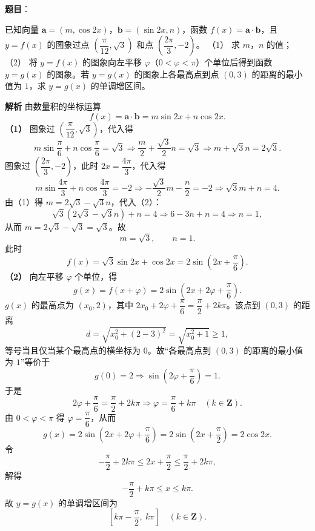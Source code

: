 \begin{answer}

\textbf{题目}：

已知向量 $\boldsymbol a=(m,\cos2x)$，$\boldsymbol b=(\sin2x,n)$，函数 $f(x)=\boldsymbol a\cdot\boldsymbol b$，且 $y=f(x)$ 的图象过点 $\left(\dfrac\pi{12},\sqrt3\right)$ 和点 $\left(\dfrac{2\pi}3,-2\right)$。
（1） 求 $m$，$n$ 的值；
（2） 将 $y=f(x)$ 的图象向左平移 $\varphi$（$0<\varphi<\pi$）个单位后得到函数 $y=g(x)$ 的图象。若 $y=g(x)$ 的图象上各最高点到点 $(0,3)$ 的距离的最小值为 $1$，求 $y=g(x)$ 的单调增区间。

\textbf{解析}
由数量积的坐标运算
\nopagebreak[4]
\[f(x)=\boldsymbol a\cdot\boldsymbol b=m\sin2x+n\cos2x .\]
\textbf{（1）} 图象过 $\left(\dfrac\pi{12},\sqrt3\right)$，代入得
\nopagebreak[4]
\[m\sin\frac\pi6+n\cos\frac\pi6=\sqrt3
\Longrightarrow\frac m2+\frac{\sqrt3}2n=\sqrt3
\Longrightarrow m+\sqrt3n=2\sqrt3 .\tag{1}\]
图象过 $\left(\dfrac{2\pi}3,-2\right)$，此时 $2x=\dfrac{4\pi}3$，代入得
\nopagebreak[4]
\[m\sin\frac{4\pi}3+n\cos\frac{4\pi}3=-2
\Longrightarrow-\frac{\sqrt3}2m-\frac n2=-2
\Longrightarrow\sqrt3m+n=4 .\tag{2}\]
由（1）得 $m=2\sqrt3-\sqrt3n$，代入（2）：
\nopagebreak[4]
\[\sqrt3(2\sqrt3-\sqrt3n)+n=4\Longrightarrow6-3n+n=4\Longrightarrow n=1,\]
从而 $m=2\sqrt3-\sqrt3=\sqrt3$。故
\nopagebreak[4]
\[m=\sqrt3,\qquad n=1 .\]
此时
\nopagebreak[4]
\[f(x)=\sqrt3\sin2x+\cos2x=2\sin\left(2x+\frac\pi6\right).\]
\textbf{（2）} 向左平移 $\varphi$ 个单位，得
\nopagebreak[4]
\[g(x)=f(x+\varphi)=2\sin\left(2x+2\varphi+\frac\pi6\right).\]
$g(x)$ 的最高点为 $\left(x_0,2\right)$，其中 $2x_0+2\varphi+\dfrac\pi6=\dfrac\pi2+2k\pi$。该点到 $(0,3)$ 的距离
\nopagebreak[4]
\[d=\sqrt{x_0^2+(2-3)^2}=\sqrt{x_0^2+1}\geqslant1,\]
等号当且仅当某个最高点的横坐标为 $0$。故“各最高点到 $(0,3)$ 的距离的最小值为 $1$”等价于
\nopagebreak[4]
\[g(0)=2\Longrightarrow\sin\left(2\varphi+\frac\pi6\right)=1 .\]
于是
\nopagebreak[4]
\[2\varphi+\frac\pi6=\frac\pi2+2k\pi\Longrightarrow\varphi=\frac\pi6+k\pi\quad(k\in\mathbf Z).\]
由 $0<\varphi<\pi$ 得 $\varphi=\dfrac\pi6$，从而
\nopagebreak[4]
\[g(x)=2\sin\left(2x+2\varphi+\frac\pi6\right)=2\sin\left(2x+\frac\pi2\right)=2\cos2x .\]
令
\nopagebreak[4]
\[-\frac\pi2+2k\pi\leqslant2x+\frac\pi2\leqslant\frac\pi2+2k\pi,\]
解得
\nopagebreak[4]
\[-\frac\pi2+k\pi\leqslant x\leqslant k\pi .\]
故 $y=g(x)$ 的单调增区间为
\nopagebreak[4]
\[\left[k\pi-\frac{\pi}{2},\ k\pi\right]\quad(k\in\mathbf Z).\]



\end{answer}
